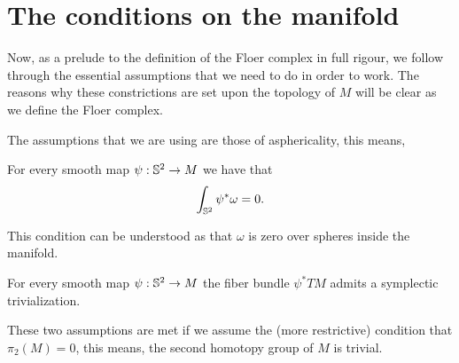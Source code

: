 \section{The conditions on the manifold}

Now, as a prelude to the definition of the Floer complex in full rigour, we follow through the essential assumptions that we need to do in order to work. The reasons why these constrictions are set upon the topology of $M$ will be clear as we define the Floer complex.

The assumptions that we are using are those of asphericality, this means,

\begin{assump} \label{assumption1}
For every smooth map $\psi : \mathbb{S}^2 \rightarrow M$ we have that
\[\int_{\mathbb{S}^2} \psi^{\ast} \omega = 0 .\]
\end{assump}

This condition can be understood as that $\omega$ is zero over spheres inside the manifold.

\begin{assump} \label{assumption2}
For every smooth map $\psi : \mathbb{S}^2 \rightarrow M$ the fiber bundle $\psi^{\ast} TM$ admits a symplectic trivialization.
\end{assump}

These two assumptions are met if we assume the (more restrictive) condition that $\pi_2(M) = 0$, this means, the second homotopy group of $M$ is trivial.
